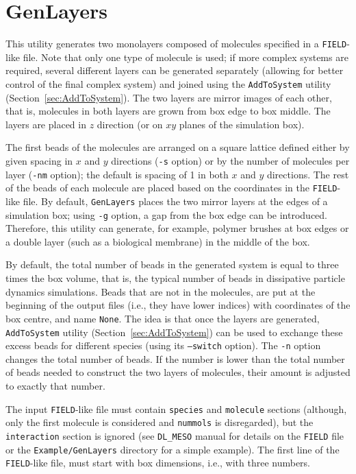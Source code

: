 \section{GenLayers} \label{sec:GenLayers}

This utility generates two monolayers composed of molecules specified in a
\texttt{FIELD}-like file. Note that only one type of molecule is used; if
more complex systems are required, several different layers can be
generated separately (allowing for better control of the final complex
system) and joined using the \texttt{AddToSystem} utility
(Section~\ref{sec:AddToSystem}). The two layers are mirror images of each
other, that is, molecules in both layers are grown from box edge to box
middle. The layers are placed in $z$ direction (or on $xy$ planes of
the simulation box).

The first beads of the molecules are arranged on a square lattice defined
either by given spacing in $x$ and $y$ directions (\texttt{-s} option) or
by the number of molecules per layer (\texttt{-nm} option); the default is
spacing of 1 in both $x$ and $y$ directions. The rest of the beads of each
molecule are placed based on the coordinates in the \texttt{FIELD}-like
file. By default, \texttt{GenLayers} places the two mirror layers at the
edges of a simulation box; using \texttt{-g} option, a gap from the box
edge can be introduced. Therefore, this utility can generate, for example,
polymer brushes at box edges or a double layer (such as a biological
membrane) in the middle of the box.

By default, the total number of beads in the generated system is equal to
three times the box volume, that is, the typical number of beads in
dissipative particle dynamics simulations. Beads that are not in the
molecules, are put at the beginning of the output files (i.e., they have
lower indices) with coordinates of the box centre, and name \texttt{None}.
The idea is that once the layers are generated, \texttt{AddToSystem}
utility (Section~\ref{sec:AddToSystem}) can be used to exchange these
excess beads for different species (using its \texttt{--switch} option).
The \texttt{-n} option changes the total number of beads. If the number is
lower than the total number of beads needed to construct the two layers of
molecules, their amount is adjusted to exactly that number.

The input \texttt{FIELD}-like file must contain \texttt{species} and
\texttt{molecule} sections (although, only the first molecule is considered
and \texttt{nummols} is disregarded), but the \texttt{interaction} section
is ignored (see \texttt{DL\_MESO} manual for details on the \texttt{FIELD}
file or the \texttt{Example/GenLayers} directory for a simple example). The
first line of the \texttt{FIELD}-like file, must start with box dimensions,
i.e., with three numbers.


